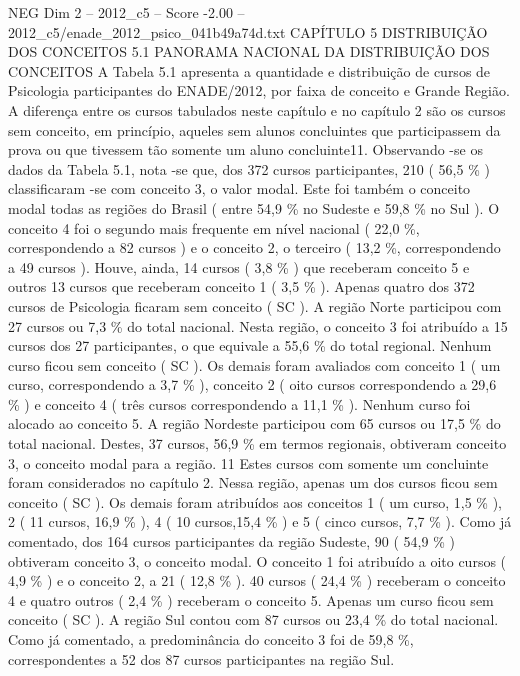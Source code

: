 \begin{textsample}{NEG Dim 2 – 2012\_c5 – Score -2.00 – 2012\_c5/enade\_2012\_psico\_041b49a74d.txt}  \label{ex:f2_neg_080}
CAPÍTULO 5 DISTRIBUIÇÃO DOS CONCEITOS 5.1 PANORAMA NACIONAL DA DISTRIBUIÇÃO DOS CONCEITOS A Tabela 5.1 apresenta a quantidade e distribuição de cursos de Psicologia participantes do ENADE/2012, por faixa de conceito e Grande Região.
A diferença entre os cursos tabulados neste capítulo e no capítulo 2 são os cursos sem conceito, em princípio, aqueles sem alunos concluintes que participassem da prova ou que tivessem tão somente um aluno concluinte11.
Observando -se os dados da Tabela 5.1, nota -se que, dos 372 cursos participantes, 210 ( 56,5 \% ) classificaram -se com conceito 3, o valor modal.
Este foi também o conceito modal todas as regiões do Brasil ( entre 54,9 \% no Sudeste e 59,8 \% no Sul ).
O conceito 4 foi o segundo mais frequente em nível nacional ( 22,0 \%, correspondendo a 82 cursos ) e o conceito 2, o terceiro ( 13,2 \%, correspondendo a 49 cursos ).
Houve, ainda, 14 cursos ( 3,8 \% ) que receberam conceito 5 e outros 13 cursos que receberam conceito 1 ( 3,5 \% ).
Apenas quatro dos 372 cursos de Psicologia ficaram sem conceito ( SC ).
A região Norte participou com 27 cursos ou 7,3 \% do total nacional.
Nesta região, o conceito 3 foi atribuído a 15 cursos dos 27 participantes, o que equivale a 55,6 \% do total regional.
Nenhum curso ficou sem conceito ( SC ).
Os demais foram avaliados com conceito 1 ( um curso, correspondendo a 3,7 \% ), conceito 2 ( oito cursos correspondendo a 29,6 \% ) e conceito 4 ( três cursos correspondendo a 11,1 \% ).
Nenhum curso foi alocado ao conceito 5.
A região Nordeste participou com 65 cursos ou 17,5 \% do total nacional.
Destes, 37 cursos, 56,9 \% em termos regionais, obtiveram conceito 3, o conceito modal para a região. 11 Estes cursos com somente um concluinte foram considerados no capítulo 2.
Nessa região, apenas um dos cursos ficou sem conceito ( SC ).
Os demais foram atribuídos aos conceitos 1 ( um curso, 1,5 \% ), 2 ( 11 cursos, 16,9 \% ), 4 ( 10 cursos,15,4 \% ) e 5 ( cinco cursos, 7,7 \% ).
Como já comentado, dos 164 cursos participantes da região Sudeste, 90 ( 54,9 \% ) obtiveram conceito 3, o conceito modal.
O conceito 1 foi atribuído a oito cursos ( 4,9 \% ) e o conceito 2, a 21 ( 12,8 \% ). 40 cursos ( 24,4 \% ) receberam o conceito 4 e quatro outros ( 2,4 \% ) receberam o conceito 5.
Apenas um curso ficou sem conceito ( SC ).
A região Sul contou com 87 cursos ou 23,4 \% do total nacional.
Como já comentado, a predominância do conceito 3 foi de 59,8 \%, correspondentes a 52 dos 87 cursos participantes na região Sul.

\end{textsample}
